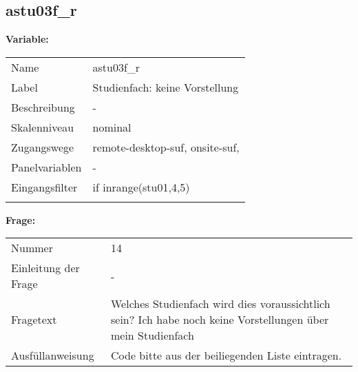 	
	
	\subsection{astu03f\_r}
	\label{subSection:astu03f_r}

	\noindent\textbf{Variable:}\\
		\begin{tabular}{lL{11.3cm}}
			\label{tableVariable:astu03f_r}
			Name & astu03f\_r \\
			Label & Studienfach: keine Vorstellung \\
			Beschreibung & - \\
			Skalenniveau & nominal \\
			Zugangswege &
				remote-desktop-suf,
				onsite-suf,
 \\
			Panelvariablen & -
			 \\
			Eingangsfilter & if inrange(stu01,4,5) \\
 \\
		\end{tabular}

		\vspace*{1 cm}
		\noindent\textbf{Frage:}\\
		\begin{tabular}{lL{11.3cm}}
			\label{tableQuestion:astu03f_r}
			Nummer & 14 \\
			Einleitung der Frage & - \\
			Fragetext & Welches Studienfach wird dies voraussichtlich sein?
Ich habe noch keine Vorstellungen über mein Studienfach \\
			Ausfüllanweisung & Code bitte aus der beiliegenden Liste eintragen. \\
		\end{tabular}





